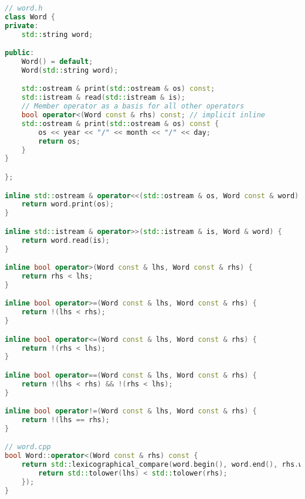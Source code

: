 \begin{lstlisting}[language=C++]
// word.h
class Word {
private:
	std::string word;

public:
	Word() = default;
	Word(std::string word);

	std::ostream & print(std::ostream & os) const;
	std::istream & read(std::istream & is);
	// Member operator as a basis for all other operators
	bool operator<(Word const & rhs) const; // implicit inline
	std::ostream & print(std::ostream & os) const {
		os << year << "/" << month << "/" << day; 
		return os;
	}
}

};

inline std::ostream & operator<<(std::ostream & os, Word const & word) {
	return word.print(os);
}

inline std::istream & operator>>(std::istream & is, Word & word) {
	return word.read(is);
}

inline bool operator>(Word const & lhs, Word const & rhs) {
	return rhs < lhs;
}

inline bool operator>=(Word const & lhs, Word const & rhs) {
	return !(lhs < rhs);
}

inline bool operator<=(Word const & lhs, Word const & rhs) {
	return !(rhs < lhs);
}

inline bool operator==(Word const & lhs, Word const & rhs) {
	return !(lhs < rhs) && !(rhs < lhs);
}

inline bool operator!=(Word const & lhs, Word const & rhs) {
	return !(lhs == rhs);
}

// word.cpp
bool Word::operator<(Word const & rhs) const {
	return std::lexicographical_compare(word.begin(), word.end(), rhs.word.begin() ,rhs.word.end(), [](char lhs, char rhs) {
		return std::tolower(lhs) < std::tolower(rhs);
	});
}
\end{lstlisting}
